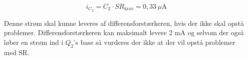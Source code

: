 \begin{equation}
\label{equ:icmin}
i_{C_2} = C_2 \cdot SR_\mathrm{krav} = 0,33~\mu \mathrm{A}
\end{equation}

Denne strøm skal kunne leveres af differensforstærkeren, hvis der ikke skal opstå problemer. Differensforstærkeren kan maksimalt levere 2 mA og selvom der også løber en strøm ind i $Q_2$'s base så vurderes der ikke at der vil opstå problemer med SR.